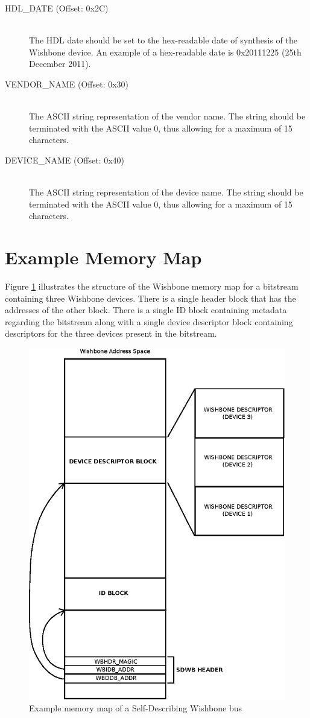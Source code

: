 \documentclass{article}
\begin{document}
\begin{description}
\item[HDL\_DATE (Offset: 0x2C)] \hfill \\
The HDL date should be set to the hex-readable date of synthesis of
the Wishbone device. An example of a hex-readable date is 0x20111225 (25th
December 2011).

\item[VENDOR\_NAME (Offset: 0x30)] \hfill \\
The ASCII string representation of the vendor name. The string should be
terminated with the ASCII value 0, thus allowing for a maximum of 15
characters.

\item[DEVICE\_NAME (Offset: 0x40)] \hfill \\
The ASCII string representation of the device name. The string should be
terminated with the ASCII value 0, thus allowing for a maximum of 15
characters.
\end{description}

\section{Example Memory Map}

Figure \ref{fig:wbmap} illustrates the
structure of the Wishbone memory map for a bitstream containing three Wishbone
devices. There is a single header block that has the addresses of the other
block. There is a single ID block containing metadata regarding the bitstream
along with a single device descriptor block containing descriptors for the three
devices present in the bitstream.

\begin{figure}[!ht]
	\centering
	\includegraphics{wbmap.eps}
	\caption{Example memory map of a Self-Describing Wishbone bus}
	\label{fig:wbmap}
\end{figure}
\end{document}
